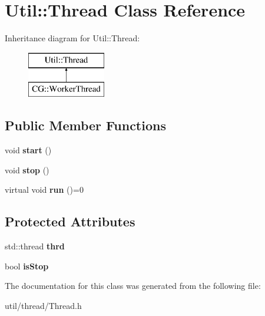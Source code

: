 \hypertarget{class_util_1_1_thread}{}\section{Util\+:\+:Thread Class Reference}
\label{class_util_1_1_thread}
Inheritance diagram for Util\+:\+:Thread\+:\begin{figure}[H]
\begin{center}
\leavevmode
\includegraphics[height=2.000000cm]{class_util_1_1_thread}
\end{center}
\end{figure}
\subsection*{Public Member Functions}
\begin{DoxyCompactItemize}
\item 
\mbox{\label{class_util_1_1_thread_a54459d58869864592196ae13aeb877ff}} 
void {\bfseries start} ()
\item 
\mbox{\label{class_util_1_1_thread_a6370a18a7409742671a1458fc0536f73}} 
void {\bfseries stop} ()
\item 
\mbox{\label{class_util_1_1_thread_a03b356f7fa0cdddcdafe54b1106a9433}} 
virtual void {\bfseries run} ()=0
\end{DoxyCompactItemize}
\subsection*{Protected Attributes}
\begin{DoxyCompactItemize}
\item 
\mbox{\label{class_util_1_1_thread_a9fdc633541c4492625cdafb16cbe7eb2}} 
std\+::thread {\bfseries thrd}
\item 
\mbox{\label{class_util_1_1_thread_af26dfdf415fbdd11d1f4a678e09399b6}} 
bool {\bfseries is\+Stop}
\end{DoxyCompactItemize}


The documentation for this class was generated from the following file\+:\begin{DoxyCompactItemize}
\item 
util/thread/Thread.\+h\end{DoxyCompactItemize}
